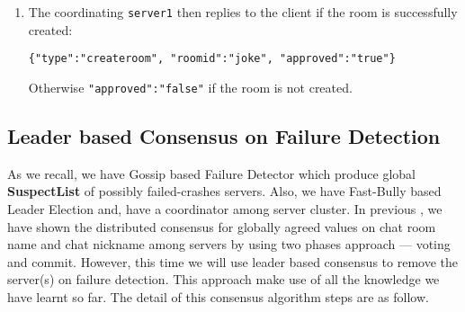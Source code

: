 \documentclass[dareport.tex]{subfiles}
\begin{document}
\begin{enumerate}[leftmargin=*]
\item The coordinating \verb|server1| then replies to the client if the room is successfully created:
\begin{small}
\begin{verbatim}
{"type":"createroom", "roomid":"joke", "approved":"true"}
\end{verbatim}
\end{small}
Otherwise \verb|"approved":"false"| if the room is not created.

\end{enumerate}

\subsection{Leader based Consensus on Failure Detection}
As we recall, we have Gossip based Failure Detector which produce global \textbf{SuspectList} of possibly failed-crashes servers. Also, we have Fast-Bully based Leader Election and, have a coordinator among server cluster. In previous , we have shown the distributed consensus for globally agreed values on chat room name and chat nickname among servers by using two phases approach --- voting and commit. However, this time we will use leader based consensus to remove the server(s) on failure detection. This approach make use of all the knowledge we have learnt so far. The detail of this consensus algorithm steps are as follow.
\end{document}
